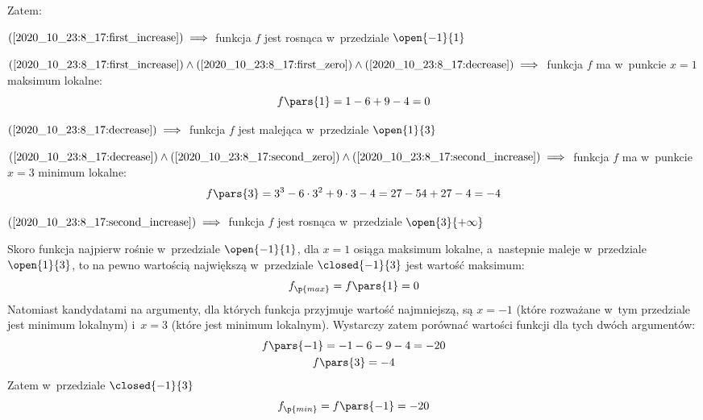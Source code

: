 Zatem:
\begin{description}
    \item \(\mbox{(\ref{2020_10_23:8_17:first_increase})} \implies\) funkcja \(f\) jest rosnąca w~przedziale \(\open{-1}{1}\)
    \item \(\mbox{(\ref{2020_10_23:8_17:first_increase})} \land \mbox{(\ref{2020_10_23:8_17:first_zero})} \land \mbox{(\ref{2020_10_23:8_17:decrease})} \implies\) funkcja \(f\) ma w~punkcie \(x = 1\) maksimum lokalne:
        \begin{equation*}
            f\pars{1} = 1 - 6 + 9 - 4 = 0
        \end{equation*}
    \item \(\mbox{(\ref{2020_10_23:8_17:decrease})} \implies\) funkcja \(f\) jest malejąca w~przedziale \(\open{1}{3}\)
    \item \(\mbox{(\ref{2020_10_23:8_17:decrease})} \land \mbox{(\ref{2020_10_23:8_17:second_zero})} \land \mbox{(\ref{2020_10_23:8_17:second_increase})} \implies\) funkcja \(f\) ma w~punkcie \(x = 3\) minimum lokalne:
        \begin{equation*}
            f\pars{3} = 3^3 - 6 \cdot 3^2 + 9 \cdot 3 - 4
                = 27 - 54 + 27 - 4
                = -4
        \end{equation*}
    \item \(\mbox{(\ref{2020_10_23:8_17:second_increase})} \implies\) funkcja \(f\) jest rosnąca w~przedziale \(\open{3}{+\infty}\)
\end{description}
Skoro funkcja najpierw rośnie w~przedziale \(\open{-1}{1}\), dla \(x = 1\) osiąga maksimum lokalne, a~nastepnie maleje w~przedziale \(\open{1}{3}\), to na pewno wartością największą w~przedziale \(\closed{-1}{3}\) jest wartość maksimum:
\begin{equation*}
    f_\p{max} = f\pars{1} = 0
\end{equation*}
Natomiast kandydatami na argumenty, dla których funkcja przyjmuje wartość najmniejszą, są \(x = -1\) (które rozważane w~tym przedziale jest minimum lokalnym) i~\(x = 3\) (które jest minimum lokalnym). Wystarczy zatem porównać wartości funkcji dla tych dwóch argumentów:
\begin{gather*}
    f\pars{-1} = -1 - 6 - 9 - 4 = -20\\
    f\pars{3} = -4
\end{gather*}
Zatem w~przedziale \(\closed{-1}{3}\)
\begin{equation*}
    f_\p{min} = f\pars{-1} = -20
\end{equation*}
